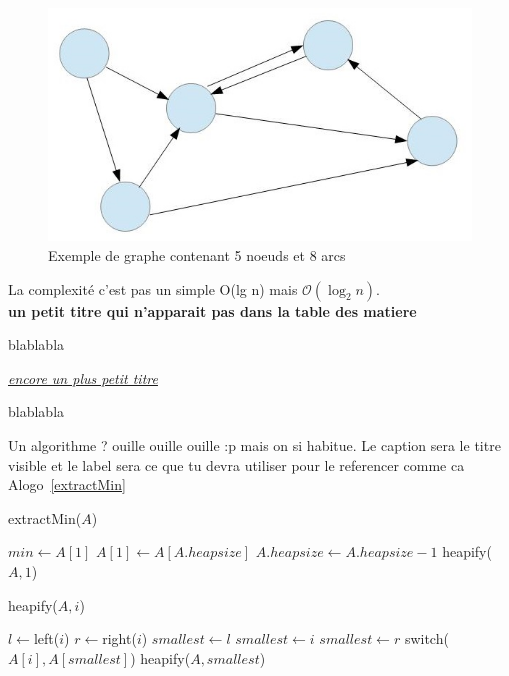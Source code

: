 \documentclass[12pt,a4paper,final]{article}
\newcommand{\smalltitle}[1]{\bigskip\large\textbf{#1}\par\normalsize\medskip}
\newcommand{\partitle}[1]{\bigskip\textit{\underline{#1}}\par\medskip}
\begin{document}
\begin{figure}
	\includegraphics[width=\textwidth]{images/Graph.jpg}
	\caption{\label{graphExample}Exemple de graphe contenant 5 noeuds et 8 arcs}
\end{figure}


La complexité c'est pas un simple O(lg n) mais $\mathcal{O}(\log_2 n)$.\\

\smalltitle{un petit titre qui n'apparait pas dans la table des matiere}
blablabla

\partitle{encore un plus petit titre}
blablabla

Un algorithme ? ouille ouille ouille :p mais on si habitue. Le caption sera le titre visible et le label sera ce que tu devra utiliser pour le referencer comme ca Alogo~\ref{extractMin}

\begin{algorithm}[H]
\caption{extractMin($A$)}\label{extractMin}
\begin{algorithmic}[1]
\STATE $min\gets A[1]$
\STATE $A[1]\gets A[A.heapsize]$
\STATE $A.heapsize\gets A.heapsize - 1$
\STATE heapify($A, 1$)
\end{algorithmic}
\end{algorithm}

\begin{algorithm}[H]
\caption{heapify($A,i$)}\label{heapify}
\begin{algorithmic}[1]
\STATE $l\gets $left($i$)
\STATE $r\gets $right($i$)
\STATE $smallest\gets l$
\ELSE
\STATE $smallest\gets i$
\ENDIF
{}
\STATE $smallest\gets r$
\ENDIF
{}
\STATE switch($A[i], A[smallest]$)
\STATE heapify($A, smallest$)
\ENDIF
\end{algorithmic}
\end{algorithm}
\end{document}
